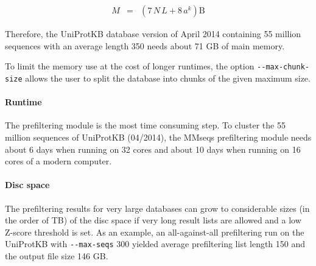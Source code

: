 \documentclass[11pt,a4paper]{report}
\begin{document}
\begin{eqnarray*}
M & = & (7\, N\, L+8\, a^{k})\mathrm{B}\end{eqnarray*}
 

Therefore, the UniProtKB database version of April 2014 containing
55 million sequences with an average length 350 needs about 71 GB
of main memory. 

To limit the memory use at the cost of longer runtimes, the option
\texttt{-{}-max-chunk-size} allows the user to split the database
into chunks of the given maximum size. 


\paragraph{Runtime}

The prefiltering module is the most time consuming step. To cluster
the 55 million sequences of UniProtKB (04/2014), the MMseqs prefiltering
module needs about 6 days when running on 32 cores and about 10 days
when running on 16 cores of a modern computer.


\paragraph{Disc space}

The prefiltering results for very large databases can grow to considerable
sizes (in the order of TB) of the disc space if very long result lists
are allowed and a low Z-score threshold is set. As an example, an
all-against-all prefiltering run on the UniProtKB with \texttt{-{}-max-seqs}
300 yielded average prefiltering list length 150 and the output file
size 146 GB.
\end{document}
